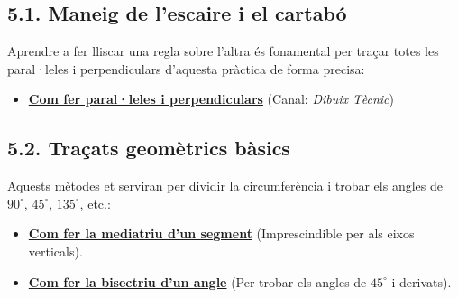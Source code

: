 \documentclass[12pt,a4paper]{article}
\begin{document}
\subsection*{5.1. Maneig de l'escaire i el cartabó}
Aprendre a fer lliscar una regla sobre l'altra és fonamental per traçar totes les paral·leles i perpendiculars d'aquesta pràctica de forma precisa:
\begin{itemize}
    \item \href{https://youtu.be/o0MkWl3NiNI?si=29xhV6AAOq9jhpVN}{\textbf{Com fer paral·leles i perpendiculars}} (Canal: \textit{Dibuix Tècnic})
\end{itemize}

\subsection*{5.2. Traçats geomètrics bàsics}
Aquests mètodes et serviran per dividir la circumferència i trobar els angles de $90^\circ$, $45^\circ$, $135^\circ$, etc.:
\begin{itemize}
    \item \href{https://youtu.be/S_ZuE6nyKCs?si=AH6DnxCn_hvAHfDr}{\textbf{Com fer la mediatriu d'un segment}} (Imprescindible per als eixos verticals).
    \item \href{https://youtu.be/HpQj_GMCUEo?si=xCUnJL3PRSF6YLJH}{\textbf{Com fer la bisectriu d'un angle}} (Per trobar els angles de $45^\circ$ i derivats).
\end{itemize}

\vspace{1cm}

\begin{center}
\end{center}
\end{document}
